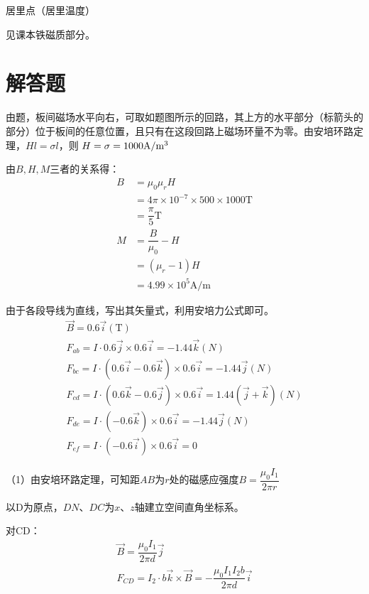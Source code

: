 \documentclass[b5paper,opensource,sourcefont,parskip]{qyxf-book}
\begin{document}
居里点（居里温度）

\solve
见课本铁磁质部分。

\section{解答题}


\solve
由题，板间磁场水平向右，可取如题图所示的回路，其上方的水平部分（标箭头的部分）位于板间的任意位置，且只有在这段回路上磁场环量不为零。由安培环路定理，$Hl=\sigma l$，则
$H=\sigma=1000 \textrm{A/m}\footnotemark[3]$

由$B,H,M$三者的关系得：
\begin{align*}
		B&=\mu_0\mu_rH\\
		&=4\pi\times 10^{-7}\times 500\times 1000 \textrm{T}\\
		&=\dfrac{\pi}{5} \textrm{T}\\	
		M&=\dfrac{B}{\mu_0}-H\\
		&=(\mu_r-1)H\\
		&=4.99\times 10^5 \textrm{A/m}
\end{align*}


\solve
由于各段导线为直线，写出其矢量式，利用安培力公式即可\footnotemark[4]。
\begin{gather*}
	\vec{B}=0.6\vec{i}(\textrm{T})\\
	F_{ab}=I\cdot 0.6\vec{j}\times 0.6\vec{i}=-1.44\vec{k}(N)\\
	F_{bc}=I\cdot (0.6\vec{i}-0.6\vec{k})\times 0.6\vec{i}=-1.44\vec{j}(N)\\
	F_{cd}=I\cdot (0.6\vec{k}-0.6\vec{j})\times 0.6\vec{i}=1.44(\vec{j}+\vec{k})(N)\\
	F_{de}=I\cdot (-0.6\vec{k})\times 0.6\vec{i}=-1.44\vec{j}(N)\\
	F_{ef}=I\cdot (-0.6\vec{i})\times 0.6\vec{i}=0
\end{gather*}


\solve
（1）由安培环路定理，可知距$AB$为$r$处的磁感应强度$B=\dfrac{\mu_0I_1}{2\pi r}$

以D为原点，$DN$、$DC$为$x$、$z$轴建立空间直角坐标系。

对CD：
\begin{gather*}
	\vec{B}=\dfrac{\mu_0I_1}{2\pi d}\vec{j}\\
	F_{CD}=I_2\cdot b\vec{k}\times \vec{B}=-\dfrac{\mu_0I_1I_2b}{2\pi d}\vec{i}
\end{gather*}
\end{document}
